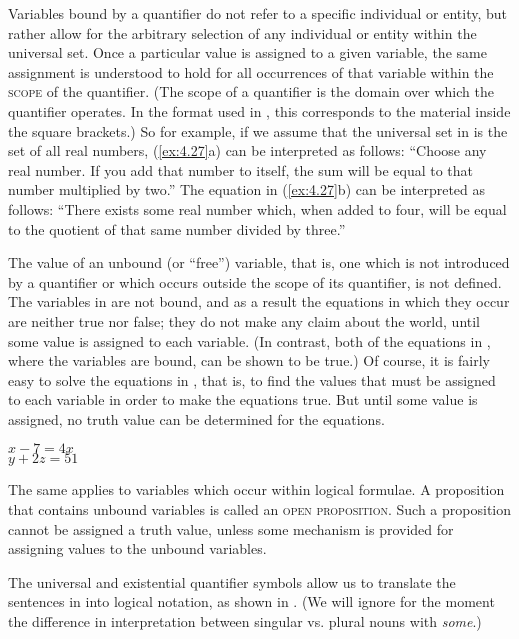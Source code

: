 Variables bound by a quantifier do not refer to a specific individual or entity, but rather allow for the arbitrary selection of any individual or entity within the universal set. Once a particular value is assigned to a given variable, the same assignment is understood to hold for all occurrences of that variable within the \textsc{scope} of the quantifier. (The scope of a quantifier is the domain over which the quantifier operates. In the format used in , this corresponds to the material inside the square brackets.) So for example, if we assume that the universal set in  is the set of all real numbers, (\ref{ex:4.27}a) can be interpreted as follows: “Choose any real number. If you add that number to itself, the sum will be equal to that number multiplied by two.” The equation in (\ref{ex:4.27}b) can be interpreted as follows: “There exists some real number which, when added to four, will be equal to the quotient of that same number divided by three.”



The value of an unbound (or “free”) variable, that is, one which is not introduced by a quantifier or which occurs outside the scope of its quantifier, is not defined. The variables in  are not bound, and as a result the equations in which they occur are neither true nor false; they do not make any claim about the world, until some value is assigned to each variable. (In contrast, both of the equations in , where the variables are bound, can be shown to be true.) Of course, it is fairly easy to solve the equations in , that is, to find the values that must be assigned to each variable in order to make the equations true. But until some value is assigned, no truth value can be determined for the equations.


\ea \label{ex:4.28}
\ea  $x-7 = 4x$\\
\ex  $y+2z = 51$
   \z
\z


The same applies to variables which occur within logical formulae. A proposition that contains unbound variables is called an \textsc{open proposition}. Such a proposition cannot be assigned a truth value, unless some mechanism is provided for assigning values to the unbound variables.



The universal and existential quantifier symbols allow us to translate the sentences in  into logical notation, as shown in . (We will ignore for the moment the difference in interpretation between singular vs. plural nouns with \textit{some}.)


